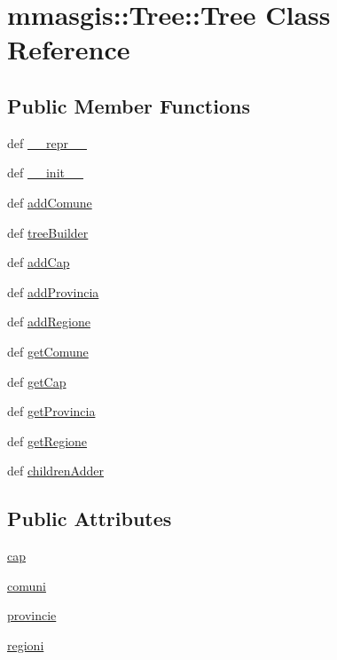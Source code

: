 \hypertarget{classmmasgis_1_1Tree_1_1Tree}{
\section{mmasgis::Tree::Tree Class Reference}
\label{classmmasgis_1_1Tree_1_1Tree}
}
\subsection*{Public Member Functions}
\begin{DoxyCompactItemize}
\item 
def \hyperlink{classmmasgis_1_1Tree_1_1Tree_ae8fa8ec39bf5653f9c2c6c1dc7971e70}{\_\-\_\-repr\_\-\_\-}
\item 
def \hyperlink{classmmasgis_1_1Tree_1_1Tree_a73c0e51cec51e7c76b0ed62f83a71d3a}{\_\-\_\-init\_\-\_\-}
\item 
def \hyperlink{classmmasgis_1_1Tree_1_1Tree_a7d2d1053440f236e0398395e94c403e8}{addComune}
\item 
def \hyperlink{classmmasgis_1_1Tree_1_1Tree_af9e41859fd65226839c944d3764c936a}{treeBuilder}
\item 
def \hyperlink{classmmasgis_1_1Tree_1_1Tree_a3b93ae13db8c4ba4d09691e161c736a3}{addCap}
\item 
def \hyperlink{classmmasgis_1_1Tree_1_1Tree_a081bbea78b37c70dd90871c8afbba194}{addProvincia}
\item 
def \hyperlink{classmmasgis_1_1Tree_1_1Tree_a5fd9f0be1c694e13e74cab8ed911007d}{addRegione}
\item 
def \hyperlink{classmmasgis_1_1Tree_1_1Tree_a0638c5e3cfd7da10cb751d248a0816b0}{getComune}
\item 
def \hyperlink{classmmasgis_1_1Tree_1_1Tree_ac454c77fff5c57dfb275bc51dd24c151}{getCap}
\item 
def \hyperlink{classmmasgis_1_1Tree_1_1Tree_a5f23fd7a8039129af29df201051f71d0}{getProvincia}
\item 
def \hyperlink{classmmasgis_1_1Tree_1_1Tree_aeaa1adb8c62cd0e4fc263b80d71c24a7}{getRegione}
\item 
def \hyperlink{classmmasgis_1_1Tree_1_1Tree_a7e60a83ac3e46f56287a42d58ab9f6f9}{childrenAdder}
\end{DoxyCompactItemize}
\subsection*{Public Attributes}
\begin{DoxyCompactItemize}
\item 
\hyperlink{classmmasgis_1_1Tree_1_1Tree_ac1476a216e93868122947fd9bcc78b08}{cap}
\item 
\hyperlink{classmmasgis_1_1Tree_1_1Tree_ad2d6f18e57b9ff6d362c4d5f4a2e8942}{comuni}
\item 
\hyperlink{classmmasgis_1_1Tree_1_1Tree_a57b120dccb7fc9329c7d46bc28709a58}{provincie}
\item 
\hyperlink{classmmasgis_1_1Tree_1_1Tree_acd5d5da7b56946113f9d04a55d4be6db}{regioni}
\end{DoxyCompactItemize}



